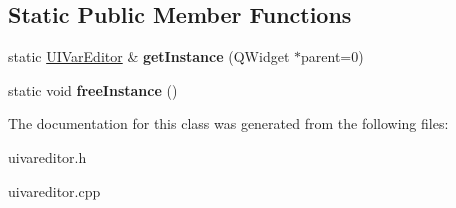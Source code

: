\subsection*{Static Public Member Functions}
\begin{DoxyCompactItemize}
\item 
static \hyperlink{class_u_i_var_editor}{U\+I\+Var\+Editor} \& {\bfseries get\+Instance} (Q\+Widget $\ast$parent=0)\hypertarget{class_u_i_var_editor_afe6bea9d74da5701eb0140c9b7736d05}{}\label{class_u_i_var_editor_afe6bea9d74da5701eb0140c9b7736d05}

\item 
static void {\bfseries free\+Instance} ()\hypertarget{class_u_i_var_editor_aa089ff51d6f8fa6a3e25b1bb41de900c}{}\label{class_u_i_var_editor_aa089ff51d6f8fa6a3e25b1bb41de900c}

\end{DoxyCompactItemize}


The documentation for this class was generated from the following files\+:\begin{DoxyCompactItemize}
\item 
uivareditor.\+h\item 
uivareditor.\+cpp\end{DoxyCompactItemize}
